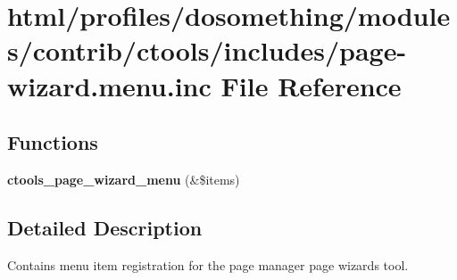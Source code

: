 \hypertarget{page-wizard_8menu_8inc}{
\section{html/profiles/dosomething/modules/contrib/ctools/includes/page-\/wizard.menu.inc File Reference}
\label{page-wizard_8menu_8inc}
}
\subsection*{Functions}
\begin{DoxyCompactItemize}
\item 
\hypertarget{page-wizard_8menu_8inc_a746d878fab4a18fe54335bb2ce9337ec}{
{\bfseries ctools\_\-page\_\-wizard\_\-menu} (\&\$items)}
\label{page-wizard_8menu_8inc_a746d878fab4a18fe54335bb2ce9337ec}

\end{DoxyCompactItemize}


\subsection{Detailed Description}
Contains menu item registration for the page manager page wizards tool. 